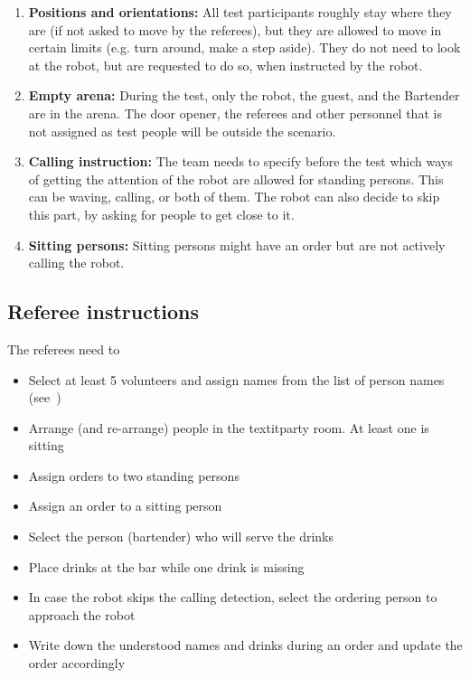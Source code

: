\begin{enumerate}
	\item \textbf{Positions and orientations:} All test participants roughly stay where they are (if not asked to move by the referees), but they are allowed to move in certain limits (e.g. turn around, make a step aside). They do not need to look at the robot, but are requested to do so, when instructed by the robot.

	\item \textbf{Empty arena:} During the test, only the robot, the guest, and the Bartender are in the arena. The door opener, the referees and other personnel that is not assigned as test people will be outside the scenario.

	\item \textbf{Calling instruction:} The team needs to specify before the test which ways of getting the attention of the robot are allowed for standing persons. This can be waving, calling, or both of them. The robot can also decide to skip this part, by asking for people to get close to it.

	\item \textbf{Sitting persons:} Sitting persons might have an order but are not actively calling the robot.
\end{enumerate}

\subsection{Referee instructions}

The referees need to
\begin{itemize}
	\item Select at least 5 volunteers and assign names from the list of person names (see~)
	\item Arrange (and re-arrange) people in the textit{party room}. At least one is sitting
	\item Assign orders to two standing persons
	\item Assign an order to a sitting person
	\item Select the person (bartender) who will serve the drinks
	\item Place drinks at the bar while one drink is missing
	\item In case the robot skips the calling detection, select the ordering person to approach the robot
	\item Write down the understood names and drinks during an order and update the order accordingly
\end{itemize}

